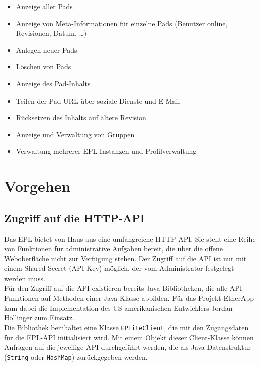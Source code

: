 \begin{itemize}
	\item Anzeige aller Pads
	\item Anzeige von Meta-Informationen für einzelne Pads (Benutzer online, Revisionen, Datum, …)
	\item Anlegen neuer Pads
	\item Löschen von Pads
	\item Anzeige des Pad-Inhalts
	\item Teilen der Pad-URL über soziale Dienste und E-Mail
	\item Rücksetzen des Inhalts auf ältere Revision
	\item Anzeige und Verwaltung von Gruppen
	\item Verwaltung mehrerer EPL-Instanzen und Profilverwaltung
\end{itemize}



\section{Vorgehen}

\subsection{Zugriff auf die HTTP-API}
Das EPL bietet von Haus aus eine umfangreiche HTTP-API.
Sie stellt eine Reihe von Funktionen für administrative Aufgaben bereit, die über die offene Weboberfläche nicht zur Verfügung stehen.
Der Zugriff auf die API ist nur mit einem Shared Secret (API Key) möglich, der vom Administrator festgelegt werden muss.\\
Für den Zugriff auf die API existieren bereits Java-Bibliotheken, die alle API-Funktionen auf Methoden einer Java-Klasse abbilden.
Für das Projekt EtherApp kam dabei die Implementation des US-amerikanischen Entwicklers Jordan Hollinger zum Einsatz.\\
Die Bibliothek beinhaltet eine Klasse \texttt{EPLiteClient}, die mit den Zugangsdaten für die EPL-API initialisiert wird.
Mit einem Objekt dieser Client-Klasse können Anfragen auf die jeweilige API durchgeführt werden, die als Java-Datenstruktur (\texttt{String} oder \texttt{HashMap}) zurückgegeben werden.

